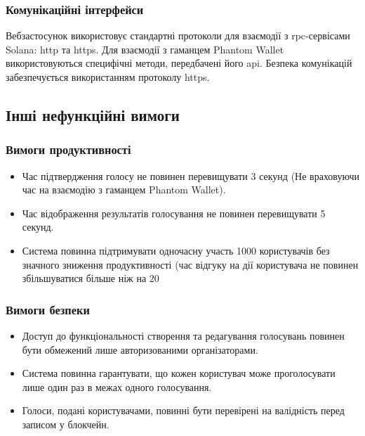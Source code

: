 \documentclass[14pt]{extreport}
\begin{document}
  \subsubsection{Комунікаційні інтерфейси}
  Вебзастосунок використовує стандартні протоколи для взаємодії з \gls{rpc}-сервісами Solana: \gls{http} та \gls{https}. Для взаємодії з гаманцем Phantom Wallet використовуються специфічні методи, передбачені його \gls{api}. Безпека комунікацій забезпечується використанням протоколу \gls{https}.
  
  \subsection{Інші нефункційні вимоги}
  \subsubsection{Вимоги продуктивності}
  \begin{itemize}
    \item Час підтвердження голосу не повинен перевищувати 3 секунд (Не враховуючи час на взаємодію з гаманцем Phantom Wallet).
    \item Час відображення результатів голосування не повинен перевищувати 5 секунд.  
    \item Система повинна підтримувати одночасну участь 1000 користувачів без значного зниження продуктивності (час відгуку на дії користувача не повинен збільшуватися більше ніж на 20%
  \end{itemize}

  \subsubsection{Вимоги безпеки}
  \begin{itemize}
    \item Доступ до функціональності створення та редагування голосувань повинен бути обмежений лише авторизованими організаторами.
    \item Система повинна гарантувати, що кожен користувач може проголосувати лише один раз в межах одного голосування.
    \item Голоси, подані користувачами, повинні бути перевірені на валідність перед записом у блокчейн.
  \end{itemize}
  
\end{document}
